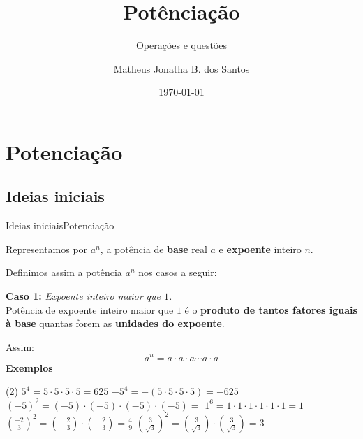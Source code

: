 \documentclass[aspectratio=169,10pt]{uu-beamer}
\title{Potênciação}
\subtitle{Operações e questões}
\author[Matheus Jonatha]{Matheus Jonatha B. dos Santos}
\date{\today}
\institute[IFRN]{Instituto Federal}
\begin{document}
\logopage

\titlepage



\section{Potenciação}
    \subsection{Ideias iniciais}
    
    \begin{frame}{Ideias iniciais}{Potenciação}
        
           Representamos por \(a^n\), a potência de \textbf{base} real \(a\) e \textbf{expoente} inteiro \(n\).
           
           Definimos assim a potência \(a^n\) nos casos a seguir:
        
        \vspace{.3cm}
            \textbf{Caso 1:} \textit{Expoente inteiro maior que \(1\).}
            \vspace{.1cm} 
            \\
                Potência de expoente inteiro maior que \(1\) é o \textbf{produto de tantos fatores iguais à base} quantas forem as \textbf{unidades do expoente}.
                
                Assim:
                        \[ a^n = a \cdot a \cdot a \cdots a \cdot a\]
\pause     
                \textbf{Exemplos}
                    \begin{tasks}(2)
                    \task \( 5^4 = 5 \cdot 5 \cdot 5 \cdot 5 = 625 \)
                    \task \( -5^4 = -(5 \cdot 5 \cdot 5 \cdot 5) = -625 \)
                    \task \( (-5)^2 = (-5) \cdot (-5) \cdot (-5) \cdot (-5)=\)
                    \task \( 1^6 = 1 \cdot 1 \cdot 1 \cdot 1 \cdot 1 \cdot 1 = 1\)
                    \task \( \left( \frac{-2}{3} \right)^2 = \left( -\frac{2}{3} \right) \cdot \left( -\frac{2}{3} \right) = \frac{4}{9}\)
                    \task \( \left( \frac{3}{\sqrt{3}} \right)^2 = \left( \frac{3}{\sqrt{3}} \right) \cdot \left( \frac{3}{\sqrt{3}} \right) = 3 \)
                \end{tasks}
    \end{frame}
\end{document}

